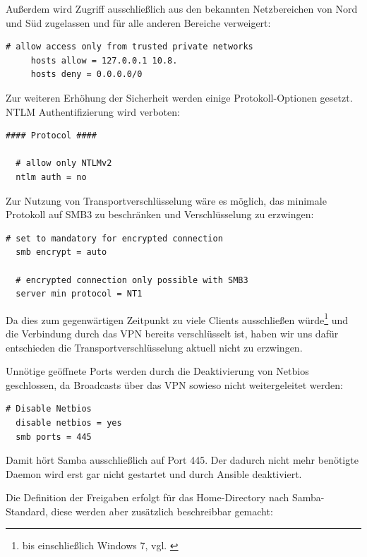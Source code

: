 Außerdem wird Zugriff ausschließlich aus den bekannten Netzbereichen von Nord und Süd zugelassen und für alle anderen Bereiche verweigert:

\begin{lstlisting}[label=code:smbconf2,caption=Ausschnitt aus /etc/samba/smb.conf]
  # allow access only from trusted private networks
     hosts allow = 127.0.0.1 10.8.
     hosts deny = 0.0.0.0/0
\end{lstlisting}

Zur weiteren Erhöhung der Sicherheit werden einige Protokoll-Optionen gesetzt. NTLM Authentifizierung wird verboten:

\begin{lstlisting}[label=code:smbconf3,caption=Ausschnitt aus /etc/samba/smb.conf]
  #### Protocol ####
  
  # allow only NTLMv2
  ntlm auth = no
  \end{lstlisting}
Zur Nutzung von Transportverschlüsselung wäre es möglich, das minimale Protokoll auf SMB3 zu beschränken und Verschlüsselung zu erzwingen:
\begin{lstlisting}[label=code:smbconf4,caption=Möglicher Eintrag in /etc/samba/smb.conf]
  # set to mandatory for encrypted connection
  smb encrypt = auto
  
  # encrypted connection only possible with SMB3
  server min protocol = NT1
  \end{lstlisting}
  
Da dies zum gegenwärtigen Zeitpunkt zu viele Clients ausschließen würde\footnote{bis einschließlich Windows 7, vgl. \cite{smbHistory}} und die Verbindung durch das VPN bereits verschlüsselt ist, haben wir uns dafür entschieden die Transportverschlüsselung aktuell nicht zu erzwingen.

Unnötige geöffnete Ports werden durch die Deaktivierung von Netbios geschlossen, da Broadcasts über das VPN sowieso nicht weitergeleitet werden:
\begin{lstlisting}[label=code:smbconf5,caption=Auszug aus /etc/samba/smb.conf]
  # Disable Netbios
  disable netbios = yes
  smb ports = 445
\end{lstlisting}
Damit hört Samba ausschließlich auf Port 445. Der dadurch nicht mehr benötigte Daemon  wird erst gar nicht gestartet und durch Ansible deaktiviert.

Die Definition der Freigaben erfolgt für das Home-Directory nach Samba-Standard, diese werden aber zusätzlich beschreibbar gemacht:

